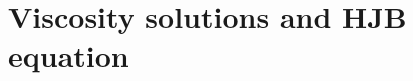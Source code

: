 \documentclass{article}
\theoremstyle{definition}
\numberwithin{equation}{section}
\numberwithin{theorem}{section}
\newcommand{\R}{\mathbb{R}}
\newcommand{\dx}{\mathrm{d}x}
\newcommand{\dy}{\mathrm{d}y}
\newcommand{\eps}{\varepsilon}
\DeclareMathOperator{\supp}{supp}
\def\comment#1{\marginpar{\raggedright\scriptsize{\textcolor{red}{#1}}}}
\newcommand{\Pcal}{{\mathcal P}}
\newcommand{\fdot}{{\,\cdot\,}}
\begin{document}










\section{Viscosity solutions and HJB equation}\label{S_viscosity}
\end{document}
